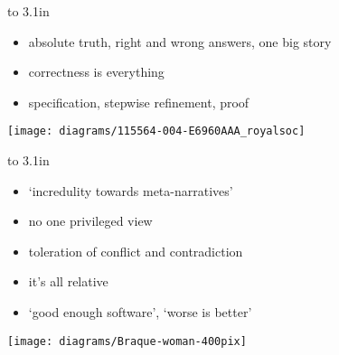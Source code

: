 \documentclass{sepslide-soa-faked} %
\begin{document}
\begin{slide}
\begin{minipage}{0.5\textwidth}\raggedright
\vbox to 3.1in{
\begin{itemize}
\item absolute truth, right and wrong answers, one big story
\item correctness is everything
\item specification, stepwise refinement, proof
\end{itemize}\vfil}
\end{minipage}
\hfil
\begin{minipage}{0.4\textwidth}\begin{flushright}%
\texttt{[image: diagrams/115564-004-E6960AAA\_royalsoc]}%
\end{flushright}\end{minipage}%
\end{slide}

\begin{slide}
\begin{minipage}{0.5\textwidth}\raggedright
\vbox to 3.1in{
\begin{itemize}
\item `incredulity towards meta-narratives'
\item no one privileged view
\item toleration of conflict and contradiction
\item it's all relative
\item `good enough software', `worse is better'
\end{itemize}\vfil}
\end{minipage}
\hfil
\begin{minipage}{0.4\textwidth}\begin{flushright}%
\texttt{[image: diagrams/Braque-woman-400pix]}%
\end{flushright}\end{minipage}%
\end{slide}
\end{document}
